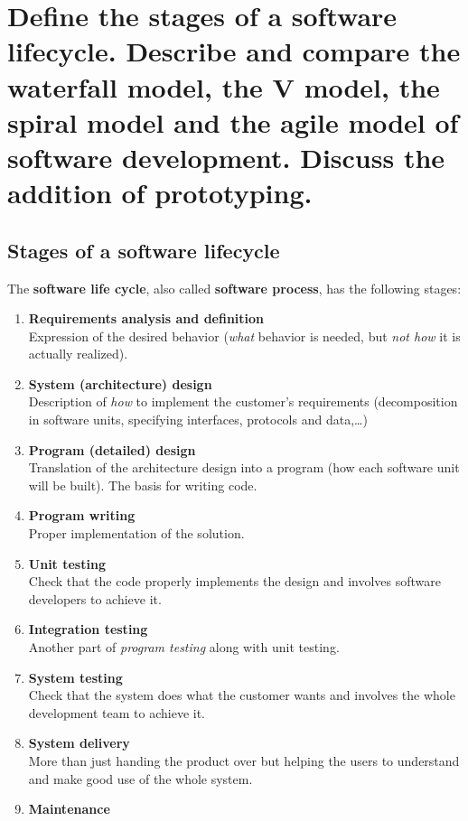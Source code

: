 \clearpage{}
\section{Define the stages of a software lifecycle. Describe and compare the
waterfall model, the V model, the spiral model and the agile model of
software development. Discuss the addition of prototyping.}

\subsection{Stages of a software lifecycle}

The \textbf{software life cycle}, also called \textbf{software process}, has the following stages:

\begin{enumerate}
    \item \textbf{Requirements analysis and definition}\\
    Expression of the desired behavior (\textit{what} behavior is needed, but \textit{not how} it is actually realized).
    \item \textbf{System (architecture) design}\\
     Description of \textit{how} to implement the customer's requirements (decomposition in software units, specifying interfaces, protocols and data,\ldots)
    \item \textbf{Program (detailed) design}\\
     Translation of the architecture design into a program (how each software unit will be built). The basis for writing code.
    \item \textbf{Program writing}\\
     Proper implementation of the solution.
    \item \textbf{Unit testing}\\
     Check that the code properly implements the design and involves software developers to achieve it.
    \item \textbf{Integration testing}\\
     Another part of \textit{program testing} along with unit testing.
    \item \textbf{System testing}\\
    Check that the system does what the customer wants and involves the whole development team to achieve it.
    \item \textbf{System delivery}\\
     More than just handing the product over but helping the users to understand and make good use of the whole system.
    \item \textbf{Maintenance}
\end{enumerate}

